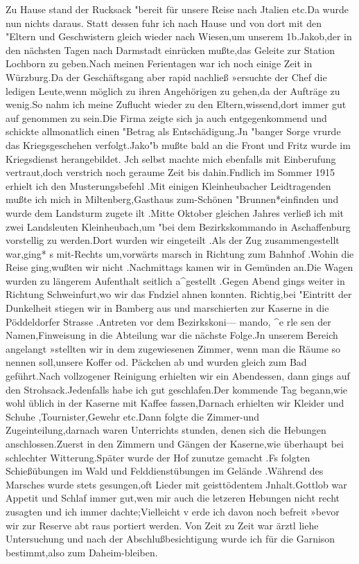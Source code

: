 \documentclass[a4paper,11pt]{article}
\begin{document}
Zu Hause stand der Rucksack "bereit für unsere Reise nach Jtalien etc.Da wurde nun nichts daraus. Statt dessen fuhr ich nach Hause und von dort mit den "Eltern und Geschwistern gleich wieder nach Wiesen,um unserem 1b.Jakob,der in den nächsten Tagen nach Darmstadt einrücken mußte,das Geleite zur Station Lochborn zu geben.Nach meinen Ferientagen war ich noch einige Zeit in Würzburg.Da der Geschäftsgang aber rapid nachließ »ersuchte der Chef die ledigen Leute,wenn möglich zu ihren Angehörigen zu gehen,da der Aufträge zu wenig.So nahm ich meine Zuflucht wieder zu den Eltern,wissend,dort immer gut auf genommen zu sein.Die Firma zeigte sich ja auch entgegenkommend und schickte allmonatlich einen "Betrag als Entschädigung.Jn "banger Sorge vrurde das Kriegsgeschehen verfolgt.Jako"b mußte bald an die Front und Fritz wurde im Kriegsdienst herangebildet. Jch selbst machte mich ebenfalls mit Einberufung vertraut,doch verstrich noch geraume Zeit bis dahin.Fndlich im Sommer 1915 erhielt ich den Musterungsbefehl .Mit einigen Kleinheubacher Leidtragenden mußte ich mich in Miltenberg,Gasthaus zum-Schönen "Brunnen*einfinden und wurde dem Landsturm zugete ilt .Mitte Oktober gleichen Jahres verließ ich mit zwei Landsleuten Kleinheubach,um "bei dem Bezirkskommando in Aschaffenburg vorstellig zu werden.Dort wurden wir eingeteilt .Als der Zug zusammengestellt war,ging* s mit-Rechts um,vorwärts marsch in Richtung zum Bahnhof .Wohin die Reise ging,wußten wir nicht .Nachmittags kamen wir in Gemünden an.Die Wagen wurden zu längerem Aufenthalt seitlich a^gestellt .Gegen Abend gings weiter in Richtung Schweinfurt,wo wir das Fndziel ahnen konnten. Richtig,bei "Eintritt der Dunkelheit stiegen wir in Bamberg aus und marschierten zur Kaserne in die Pöddeldorfer Strasse .Antreten vor dem Bezirkskoni— mando, ^e rle sen der Namen,Finweisung in die Abteilung war die nächste Folge.Jn unserem Bereich angelangt »stellten wir in dem zugewiesenen Zimmer, wenn man die Räume so nennen soll,unsere Koffer od. Päckchen ab und wurden gleich zum Bad geführt.Nach vollzogener Reinigung erhielten wir ein Abendessen, dann gings auf den Strohsack.Jedenfalls habe ich gut geschlafen.Der kommende Tag begann,wie wohl üblich in der Kaserne mit Kaffee fassen,Darnach erhielten wir Kleider und Schuhe ,Tournister,Gewehr etc.Dann folgte die Zimmer-und Zugeinteilung,darnach waren Unterrichts stunden, denen sich die Hebungen anschlossen.Zuerst in den Zimmern und Gängen der Kaserne,wie überhaupt bei schlechter Witterung.Später wurde der Hof zunutze gemacht .Fs folgten Schießübungen im Wald und Felddienstübungen im Gelände .Während des Marsches wurde stets gesungen,oft Lieder mit geisttödentem Jnhalt.Gottlob war Appetit und Schlaf immer gut,wen mir auch die letzeren Hebungen nicht recht zusagten und ich immer dachte;Vielleicht v erde ich davon noch befreit »bevor wir zur Reserve abt raus portiert werden. Von Zeit zu Zeit war ärztl liehe Untersuchung und nach der Abschlußbesichtigung wurde ich für die Garnison bestimmt,also zum Daheim-bleiben.
\end{document}
